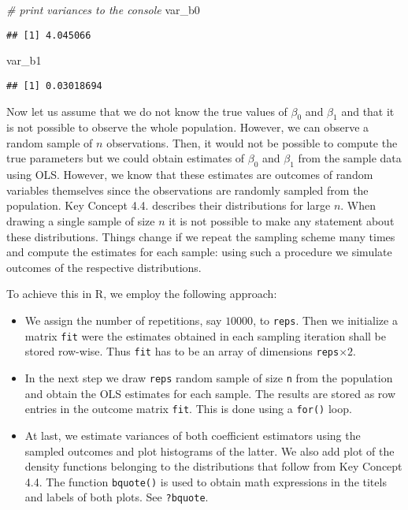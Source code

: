 \documentclass[]{book}
\newenvironment{Shaded}{\begin{snugshade}}{\end{snugshade}}
\newcommand{\CommentTok}[1]{\textcolor[rgb]{0.56,0.35,0.01}{\textit{#1}}}
\newcommand{\NormalTok}[1]{#1}
\providecommand{\tightlist}{%
  \setlength{\itemsep}{0pt}\setlength{\parskip}{0pt}}
\theoremstyle{definition}
\theoremstyle{definition}
\theoremstyle{definition}
\theoremstyle{remark}
\begin{document}
\begin{Shaded}
\begin{Highlighting}[]
\CommentTok{# print variances to the console}
\NormalTok{var_b0}
\end{Highlighting}
\end{Shaded}

\begin{verbatim}
## [1] 4.045066
\end{verbatim}

\begin{Shaded}
\begin{Highlighting}[]
\NormalTok{var_b1}
\end{Highlighting}
\end{Shaded}

\begin{verbatim}
## [1] 0.03018694
\end{verbatim}

Now let us assume that we do not know the true values of \(\beta_0\) and
\(\beta_1\) and that it is not possible to observe the whole population.
However, we can observe a random sample of \(n\) observations. Then, it
would not be possible to compute the true parameters but we could obtain
estimates of \(\beta_0\) and \(\beta_1\) from the sample data using OLS.
However, we know that these estimates are outcomes of random variables
themselves since the observations are randomly sampled from the
population. Key Concept 4.4. describes their distributions for large
\(n\). When drawing a single sample of size \(n\) it is not possible to
make any statement about these distributions. Things change if we repeat
the sampling scheme many times and compute the estimates for each
sample: using such a procedure we simulate outcomes of the respective
distributions.

To achieve this in R, we employ the following approach:

\begin{itemize}
\tightlist
\item
  We assign the number of repetitions, say \(10000\), to \texttt{reps}.
  Then we initialize a matrix \texttt{fit} were the estimates obtained
  in each sampling iteration shall be stored row-wise. Thus \texttt{fit}
  has to be an array of dimensions \texttt{reps}\(\times2\).
\item
  In the next step we draw \texttt{reps} random sample of size
  \texttt{n} from the population and obtain the OLS estimates for each
  sample. The results are stored as row entries in the outcome matrix
  \texttt{fit}. This is done using a \texttt{for()} loop.
\item
  At last, we estimate variances of both coefficient estimators using
  the sampled outcomes and plot histograms of the latter. We also add
  plot of the density functions belonging to the distributions that
  follow from Key Concept 4.4. The function \texttt{bquote()} is used to
  obtain math expressions in the titels and labels of both plots. See
  \texttt{?bquote}.
\end{itemize}
\end{document}
